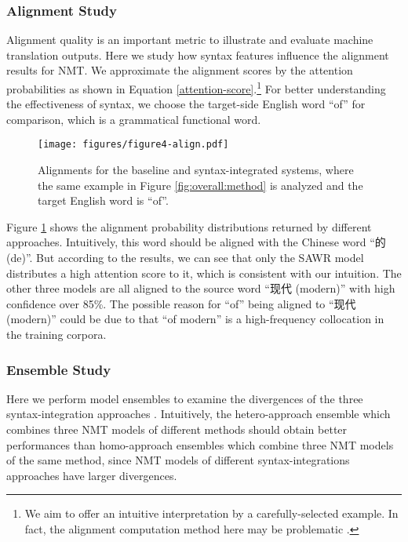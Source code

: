 \documentclass[11pt,a4paper]{article}
\begin{document}
\begin{CJK}{UTF8}{gbsn}
\subsubsection{\normalsize Alignment Study}
Alignment quality is an important metric to illustrate and evaluate machine translation outputs.
Here we study how syntax features influence the alignment results for NMT.
We approximate the alignment scores by the attention probabilities
as shown in Equation \ref{attention-score}.\footnote{We aim to offer an intuitive interpretation by a carefully-selected example. In fact, the alignment computation method here may be problematic \cite{W17-3204}.}
For better understanding the effectiveness of syntax,
we choose the target-side English word ``of'' for comparison,
which is a grammatical functional word.

\begin{figure}[tb]
	\centerline{\texttt{[image: figures/figure4-align.pdf]}}
	\caption{Alignments for the baseline and syntax-integrated systems,
		where the same example in Figure \ref{fig:overall:method} is analyzed and the target English word is ``of''. }\label{analyze-linear}
\end{figure}

Figure \ref{analyze-linear} shows the alignment probability distributions returned by different approaches.
Intuitively, this word should be aligned with the Chinese word ``的(de)''.
But according to the results, we can see that
only the SAWR model distributes a high attention score to it, which is consistent with our intuition.
The other three models are all aligned to the source word ``现代 (modern)'' with high confidence over 85\%.
The possible reason for ``of'' being aligned to ``现代 (modern)'' could be due to that ``of modern'' is a high-frequency collocation in the training corpora.












\subsubsection{\normalsize Ensemble Study}
Here we perform model ensembles to examine the divergences of the three syntax-integration approaches \cite{zhou-EtAl:2017:Short1,denkowski17nmt}.
Intuitively, the hetero-approach ensemble which combines three NMT models of different methods
should obtain better performances than homo-approach ensembles which combine three NMT models of the same method,
since NMT models of different syntax-integrations approaches have larger divergences.


\end{CJK}
\end{document}
